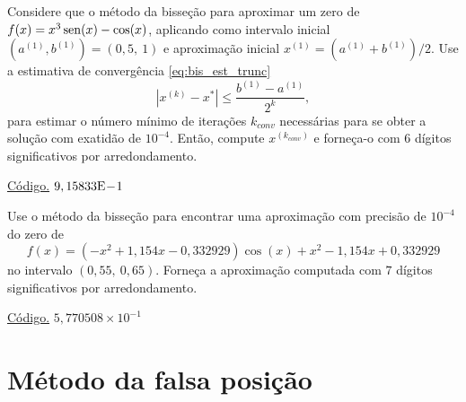 \begin{exer}\label{exer:bis_est_trunc}
  Considere que o método da bisseção para aproximar um zero de $f(x)=x^3\operatorname{sen}(x)-\cos(x)$, aplicando como intervalo inicial $(a^{(1)}, b^{(1)}) = (0,5, ~1)$ e aproximação inicial $x^{(1)}=(a^{(1)}+b^{(1)})/2$. Use a estimativa de convergência \eqref{eq:bis_est_trunc}
  \begin{equation}
    \left|x^{(k)} - x^{*}\right| \leq \frac{b^{(1)}-a^{(1)}}{2^k},
  \end{equation}
para estimar o número mínimo de iterações $k_{conv}$ necessárias para se obter a solução com exatidão de $10^{-4}$. Então, compute $x^{(k_{conv})}$ e forneça-o com $6$ dígitos significativos por arredondamento.
\end{exer}
\begin{resp}
    \ifisoctave 
  \href{https://github.com/phkonzen/notas/blob/master/src/MatematicaNumerica/cap_aritm/dados/exer_bis_este_trunc/exer_bis_est_trunc.m}{Código.} 
  \fi
  $9,15833\mathrm{E}\!-\!1$
\end{resp}

\begin{exer}\label{exer:bis_multpar}
  Use o método da bisseção para encontrar uma aproximação com precisão de $10^{-4}$ do zero de
  \begin{equation}
    f(x) = (-x^2+1,154x-0,332929)\cos(x) + x^2 - 1,154x + 0,332929
  \end{equation}
no intervalo $(0,55, ~0,65)$. Forneça a aproximação computada com $7$ dígitos significativos por arredondamento.
\end{exer}
\begin{resp}
    \ifisoctave 
  \href{https://github.com/phkonzen/notas/blob/master/src/MatematicaNumerica/cap_aritm/dados/exer_bis_multpar/exer_bis_multpar.m}{Código.} 
  \fi
  $5,770508\times 10^{-1}$
\end{resp}

\section{Método da falsa posição}\label{cap_eq1d_sec_falsapos}

\emconstrucao
